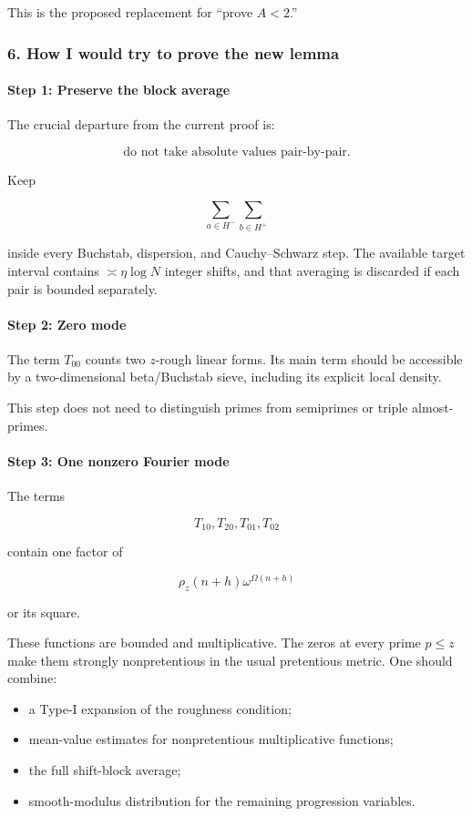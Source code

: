 This is the proposed replacement for “prove \(A<2\).”

\medskip
\medskip


\subsubsection*{6. How I would try to prove the new lemma}

\paragraph{Step 1: Preserve the block average}

The crucial departure from the current proof is:

\[
\text{do not take absolute values pair-by-pair.}
\]

Keep

\[
\sum_{a\in H^-}\sum_{b\in H^+}
\]

inside every Buchstab, dispersion, and Cauchy–Schwarz step. The available target interval contains \(\asymp\eta\log N\) integer shifts, and that averaging is discarded if each pair is bounded separately.

\paragraph{Step 2: Zero mode}

The term \(T_{00}\) counts two \(z\)-rough linear forms. Its main term should be accessible by a two-dimensional beta/Buchstab sieve, including its explicit local density.

This step does not need to distinguish primes from semiprimes or triple almost-primes.

\paragraph{Step 3: One nonzero Fourier mode}

The terms

\[
T_{10},T_{20},T_{01},T_{02}
\]

contain one factor of

\[
\rho_z(n+h)\omega^{\Omega(n+h)}
\]

or its square.

These functions are bounded and multiplicative. The zeros at every prime \(p\le z\) make them strongly nonpretentious in the usual pretentious metric. One should combine:

\begin{itemize}
\item a Type-I expansion of the roughness condition;
\item mean-value estimates for nonpretentious multiplicative functions;
\item the full shift-block average;
\item smooth-modulus distribution for the remaining progression variables.
\end{itemize}

